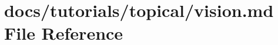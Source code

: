 \hypertarget{vision_8md}{}\section{docs/tutorials/topical/vision.md File Reference}
\label{vision_8md}
